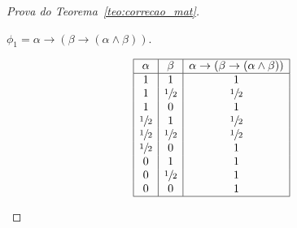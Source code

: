 \begin{proof}[Prova do Teorema~\ref{teo:correcao_mat}]
\begin{provaporcasos}
\begin{provaporsubcasos}
\begin{center}
                        \end{center}
                    

                    \subcasodeprova{} $\phi_{1} = \alpha \to (\beta \to (\alpha \land \beta))$. 

                    \begin{center}
                        \[
                            \begin{array}{|c|c|c|}%
                                \hline%
                                \alpha      & \beta & \alpha \to (\beta \to (\alpha \land \beta)) \\
                                \hline%
                                1&1&               1\\ 
                                1&\meio{}&\meio{}\\
                                1&0&1\\
                                \meio{}&1&\meio{}\\
                                \meio{}&\meio{}&\meio{}\\
                                \meio{}&0&1\\
                                0&1&1\\
                                0&\meio{}&1\\
                                0&0&1\\
                                \hline%
                            \end{array}
                        \]
                    \end{center}


\end{provaporsubcasos}
\end{provaporcasos}
\end{proof}
